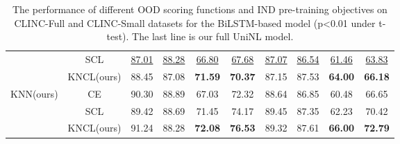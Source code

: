 \documentclass[11pt]{article}
\begin{document}
\begin{table}[t]
{\begin{tabular}{c|c|cc|cc|cc|cc}
        ~ & SCL &\underline{87.01}	&\underline{88.28}	&\underline{66.80}	&\underline{67.68}   &\underline{87.07}	&\underline{86.54}	&\underline{61.46}	&\underline{63.83}  \\ 
        ~ & KNCL(ours) &88.45	&87.08	&\textbf{71.59}	&\textbf{70.37}   &87.15	&87.53	&\textbf{64.00}	&\textbf{66.18}  \\ \hline
        \multirow{3}{*}{KNN(ours)} & CE   &90.30	&88.89	&67.03	 &72.32  &88.64	&86.85	&60.48	&66.65   \\ 
        ~ & SCL &89.42	&88.69	&71.45	&74.17   &89.45	&87.35	&62.23	&70.42 \\ 
        ~ & KNCL(ours)   &91.24	&88.28	&\textbf{72.08}	&\textbf{76.53}   &89.32	&87.61	&\textbf{66.00}	&\textbf{72.79} \\ \hline
        
    \end{tabular}%
}
\caption{The performance of different OOD scoring functions and IND pre-training objectives on CLINC-Full and CLINC-Small datasets for the BiLSTM-based model (p<0.01 under t-test). The last line is our full UniNL model.}
\label{main}
\end{table}
\end{document}
